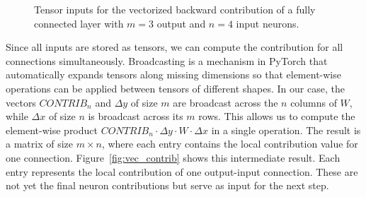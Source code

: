 \documentclass[
12pt,
fancyheadings,
a4paper,
twoside,
BCOR=0.7cm,
nobcorignoretitle,
grayscalebody,
]{stsreprt}
\begin{document}
\begin{figure}[ht]
\centering
{}
\caption{Tensor inputs for the vectorized backward contribution of a fully connected layer with $m = 3$ output and $n = 4$ input neurons.}
\label{fig:vec_inputs}
\end{figure}

Since all inputs are stored as tensors, we can compute the contribution for all connections
simultaneously.
Broadcasting is a mechanism in PyTorch that automatically expands tensors along missing dimensions
so that element-wise operations can be applied between tensors of different shapes.
In our case, the vectors $\textit{CONTRIB}_n$ and $\Delta y$ of size $m$ are broadcast across the
$n$ columns of $W$, while $\Delta x$ of size $n$ is broadcast across its $m$ rows.
This allows us to compute the element-wise product $\textit{CONTRIB}_n \cdot \Delta y \cdot W \cdot
\Delta x$ in a single operation.
The result is a matrix of size $m \times n$, where each entry contains the local contribution value
for one connection.
Figure~\ref{fig:vec_contrib} shows this intermediate result. Each entry represents the local
contribution of one output-input connection. These are not yet the final neuron contributions but
serve as input for the next step.
\end{document}
